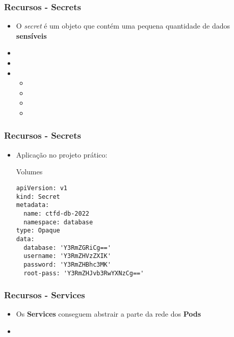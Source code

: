 \begin{frame}
\frametitle{Recursos - Secrets}

\begin{itemize}
	\item O \textit{secret} é um objeto que contém uma pequena quantidade de dados \textbf{sensíveis}
	\item {}
	\item {}
	\item {}
		\begin{itemize}
			\item {}
			\item {}
			\item {}
			\item {}
		\end{itemize}
\end{itemize}
\end{frame}

\begin{frame}[containsverbatim]
\frametitle{Recursos - Secrets}
\begin{itemize}
	\item Aplicação no projeto prático:
\begin{center}
\begin{minipage}{0.9\textwidth}
\begin{block}{Volumes}
\begin{lstlisting}
apiVersion: v1
kind: Secret
metadata:
  name: ctfd-db-2022
  namespace: database
type: Opaque
data:
  database: 'Y3RmZGRiCg=='
  username: 'Y3RmZHVzZXIK'
  password: 'Y3RmZHBhc3MK'
  root-pass: 'Y3RmZHJvb3RwYXNzCg=='
\end{lstlisting}
\end{block}
\end{minipage}
\end{center}
\end{itemize}
\end{frame}

\begin{frame}
\frametitle{Recursos - Services}
\begin{itemize}
	\item Os \textbf{Services} conseguem abstrair a parte da rede dos \textbf{Pods}
	\item {}
\end{itemize}
\end{frame}

